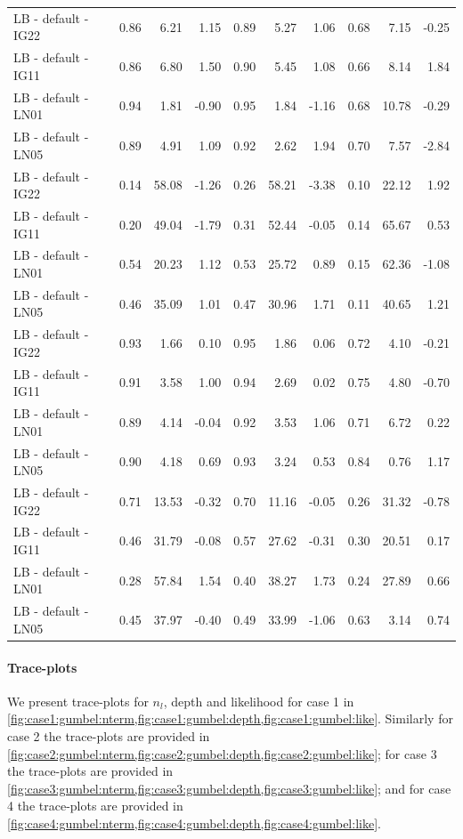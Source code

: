 \documentclass{amsart}
\begin{document}
\begin{table}[ht]
{\begin{tabular}{l|crr|crr|crr}
			\midrule
			LB - default - IG22 & 0.86 & 6.21 & 1.15 & 0.89 & 5.27 & 1.06 & 0.68 & 7.15 & -0.25 \\ 
			LB - default - IG11 & 0.86 & 6.80 & 1.50 & 0.90 & 5.45 & 1.08 & 0.66 & 8.14 & 1.84 \\ 
			LB - default - LN01 & 0.94 & 1.81 & -0.90 & 0.95 & 1.84 & -1.16 & 0.68 & 10.78 & -0.29 \\ 
			LB - default - LN05 & 0.89 & 4.91 & 1.09 & 0.92 & 2.62 & 1.94 & 0.70 & 7.57 & -2.84 \\ 
			\midrule
			LB - default - IG22 & 0.14 & 58.08 & -1.26 & 0.26 & 58.21 & -3.38 & 0.10 & 22.12 & 1.92 \\ 
			LB - default - IG11 & 0.20 & 49.04 & -1.79 & 0.31 & 52.44 & -0.05 & 0.14 & 65.67 & 0.53 \\ 
			LB - default - LN01 & 0.54 & 20.23 & 1.12 & 0.53 & 25.72 & 0.89 & 0.15 & 62.36 & -1.08 \\ 
			LB - default - LN05 & 0.46 & 35.09 & 1.01 & 0.47 & 30.96 & 1.71 & 0.11 & 40.65 & 1.21 \\ 
			\midrule
			LB - default - IG22 & 0.93 & 1.66 & 0.10 & 0.95 & 1.86 & 0.06 & 0.72 & 4.10 & -0.21 \\ 
			LB - default - IG11 & 0.91 & 3.58 & 1.00 & 0.94 & 2.69 & 0.02 & 0.75 & 4.80 & -0.70 \\ 
			LB - default - LN01 & 0.89 & 4.14 & -0.04 & 0.92 & 3.53 & 1.06 & 0.71 & 6.72 & 0.22 \\ 
			LB - default - LN05 & 0.90 & 4.18 & 0.69 & 0.93 & 3.24 & 0.53 & 0.84 & 0.76 & 1.17 \\ 
			\midrule
			LB - default - IG22 & 0.71 & 13.53 & -0.32 & 0.70 & 11.16 & -0.05 & 0.26 & 31.32 & -0.78 \\ 
			LB - default - IG11 & 0.46 & 31.79 & -0.08 & 0.57 & 27.62 & -0.31 & 0.30 & 20.51 & 0.17 \\ 
			LB - default - LN01 & 0.28 & 57.84 & 1.54 & 0.40 & 38.27 & 1.73 & 0.24 & 27.89 & 0.66 \\ 
			LB - default - LN05 & 0.45 & 37.97 & -0.40 & 0.49 & 33.99 & -1.06 & 0.63 & 3.14 & 0.74 \\ 
			\bottomrule
	\end{tabular}}
\end{table}

\paragraph{Trace-plots} We present trace-plots for $n_l$, depth and likelihood for case 1 in \cref{fig:case1:gumbel:nterm,fig:case1:gumbel:depth,fig:case1:gumbel:like}. Similarly for case 2 the trace-plots are provided in \cref{fig:case2:gumbel:nterm,fig:case2:gumbel:depth,fig:case2:gumbel:like}; for case 3 the trace-plots are provided in \cref{fig:case3:gumbel:nterm,fig:case3:gumbel:depth,fig:case3:gumbel:like}; and for case 4 the trace-plots are provided in \cref{fig:case4:gumbel:nterm,fig:case4:gumbel:depth,fig:case4:gumbel:like}.
\end{document}
